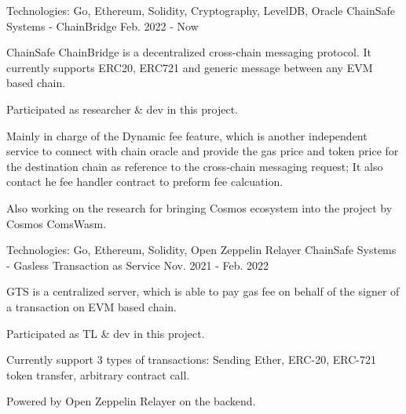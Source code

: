 \begin{cventries}
\cventry
    {Technologies: \quad Go, Ethereum, Solidity, Cryptography, LevelDB, Oracle}
    {ChainSafe Systems - ChainBridge}
    {}
    {Feb. 2022 - Now}
    {
      \begin{cvitems}
        \item {ChainSafe ChainBridge is a decentralized cross-chain messaging protocol. It currently supports ERC20, ERC721 and generic message between any EVM based chain.}
        \item {Participated as researcher \& dev in this project.}
        \item {Mainly in charge of the Dynamic fee feature, which is another independent service to connect with chain oracle and provide the gas price and token price for the destination chain as reference to the cross-chain messaging request; It also contact he fee handler contract to preform fee calcuation.}
        \item {Also working on the research for bringing Cosmos ecosystem into the project by Cosmos ComsWasm.}
      \end{cvitems}
    }

\cventry
    {Technologies: \quad Go, Ethereum, Solidity, Open Zeppelin Relayer}
    {ChainSafe Systems - Gasless Transaction as Service}
    {}
    {Nov. 2021 - Feb. 2022}
    {
      \begin{cvitems}
        \item {GTS is a centralized server, which is able to pay gas fee on behalf of the signer of a transaction on EVM based chain.}
        \item {Participated as TL \& dev in this project.}
        \item {Currently support 3 types of transactions: Sending Ether, ERC-20, ERC-721 token transfer, arbitrary contract call.}
        \item {Powered by Open Zeppelin Relayer on the backend.}
      \end{cvitems}
    }


\end{cventries}
